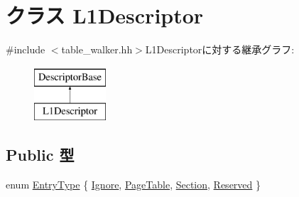 \hypertarget{classArmISA_1_1TableWalker_1_1L1Descriptor}{
\section{クラス L1Descriptor}
\label{classArmISA_1_1TableWalker_1_1L1Descriptor}
}


{\ttfamily \#include $<$table\_\-walker.hh$>$}L1Descriptorに対する継承グラフ:\begin{figure}[H]
\begin{center}
\leavevmode
\includegraphics[height=2cm]{classArmISA_1_1TableWalker_1_1L1Descriptor}
\end{center}
\end{figure}
\subsection*{Public 型}
\begin{DoxyCompactItemize}
\item 
enum \hyperlink{classArmISA_1_1TableWalker_1_1L1Descriptor_a9ed8d16c9ae7fae285dd2146c3159023}{EntryType} \{ \hyperlink{classArmISA_1_1TableWalker_1_1L1Descriptor_a9ed8d16c9ae7fae285dd2146c3159023a4228a8c9f9b740ebe4269b084a41bcc1}{Ignore}, 
\hyperlink{classArmISA_1_1TableWalker_1_1L1Descriptor_a9ed8d16c9ae7fae285dd2146c3159023abf5659cc171b92fece0428763b4c793c}{PageTable}, 
\hyperlink{classArmISA_1_1TableWalker_1_1L1Descriptor_a9ed8d16c9ae7fae285dd2146c3159023a53f0e1278b0ddeedcb004b781f90f4f0}{Section}, 
\hyperlink{classArmISA_1_1TableWalker_1_1L1Descriptor_a9ed8d16c9ae7fae285dd2146c3159023a6136a0872216f91100b42ea04333af70}{Reserved}
 \}
\end{DoxyCompactItemize}
